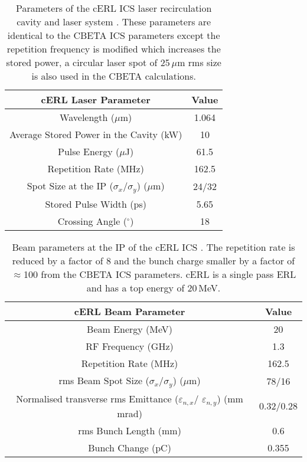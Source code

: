 \documentclass[11pt]{article}
\begin{document}
\begin{table}[H]
\centering
\begin{tabular}{|c||c|}
\hline
\textbf{cERL Laser Parameter} & \textbf{Value} \\
\hline
Wavelength ($\mu$m) & 1.064 \\
\hline
Average Stored Power in the Cavity (kW) & 10 \\
\hline
Pulse Energy ($\mu$J) & 61.5 \\
\hline
Repetition Rate (MHz) & 162.5 \\
\hline
Spot Size at the IP ($\sigma_{x}/\sigma_{y}$) ($\mu$m) & 24/32 \\
\hline
Stored Pulse Width (ps) & 5.65 \\
\hline
Crossing Angle ($^{\circ}$) & 18 \\
\hline
\end{tabular}
\caption{\label{tab:cERLlaser} Parameters of the cERL ICS laser recirculation cavity and laser system \cite{TAkagicERL}. These parameters are identical to the CBETA ICS parameters except the repetition frequency is modified which increases the stored power, a circular laser spot of 25\,$\mu$m rms size is also used in the CBETA calculations.}
\end{table}

\begin{table}[H]
\centering
\begin{tabular}{|c||c|}
\hline
\textbf{cERL Beam Parameter} & \textbf{Value} \\
\hline
Beam Energy (MeV) &  20 \\
\hline
RF Frequency (GHz) & 1.3 \\
\hline
Repetition Rate (MHz) & 162.5 \\  
\hline
rms Beam Spot Size ($\sigma_{x}/\sigma_{y}$) ($\mu$m) & 78/16 \\
\hline
Normalised transverse rms Emittance ($\varepsilon_{n, x}$/ $\varepsilon_{n, y}$) (mm mrad) & 0.32/0.28 \\
\hline
rms Bunch Length (mm) & 0.6 \\
\hline
Bunch Change (pC) & 0.355 \\
\hline
\end{tabular}
\caption{\label{tab:cERLbeam} Beam parameters at the IP of the cERL ICS \cite{TAkagicERL}. The repetition rate is reduced by a factor of 8 and the bunch charge smaller by a factor of $\approx$100 from the CBETA ICS parameters. cERL is a single pass ERL and has a top energy of 20\,MeV.}
\end{table}
\end{document}
